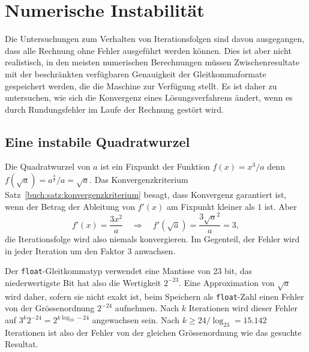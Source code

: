 %
%
%
\section{Numerische Instabilität
\label{buch:section:instabilitaet}}
Die Untersuchungen zum Verhalten von Iterationsfolgen sind davon
ausgegangen, dass alle Rechnung ohne Fehler ausgeführt werden können.
Dies ist aber nicht realistisch, in den meisten numerischen Berechnungen
müssen Zwischenresultate mit der beschränkten verfügbaren Genauigkeit
der Gleitkommaformate gespeichert werden, die die Maschine zur Verfügung
stellt.
Es ist daher zu untersuchen, wie sich die Konvergenz eines Lösungsverfahrens
ändert, wenn es durch Rundungsfehler im Laufe der Rechnung gestört wird.

%
%
\subsection{Eine instabile Quadratwurzel
\label{buch:subsection:quadratwurzel}}
Die Quadratwurzel von $a$ ist ein Fixpunkt der Funktion
$f(x)=x^3/a$ denn $f(\sqrt{a})=a^{\frac32}/a=\sqrt{a}$.
Das Konvergenzkriterium Satz~\ref{buch:satz:konvergenzkriterium} besagt,
dass Konvergenz garantiert ist, wenn der Betrag der Ableitung von $f'(x)$
am Fixpunkt kleiner als $1$ ist.
Aber
\[
f'(x) = \frac{3x^2}{a}
\quad\Rightarrow\quad
f'(\!\sqrt{a}) = \frac{3\sqrt{a}^2}{a}=3,
\]
die Iterationsfolge wird also niemals konvergieren.
Im Gegenteil, der Fehler wird in jeder Iteration um den Faktor $3$
anwachsen.

Der \texttt{float}-Gleitkommatyp verwendet eine Mantisse von 23 bit,
das niederwertigste Bit hat also die Wertigkeit $2^{-23}$.
Eine Approximation von $\sqrt{a}$ wird daher, sofern sie nicht
exakt ist, beim Speichern als \texttt{float}-Zahl einen Fehler
von der Grössenordnung $2^{-24}$ aufnehmen.
Nach $k$ Iterationen wird dieser Fehler auf $3^k2^{-24}=2^{k\log_23-24}$
angewachsen sein.
Nach $k\ge 24/\log_23=15.142$ Iterationen ist also der Fehler von der
gleichen Grössenordnung wie das gesuchte Resultat.

